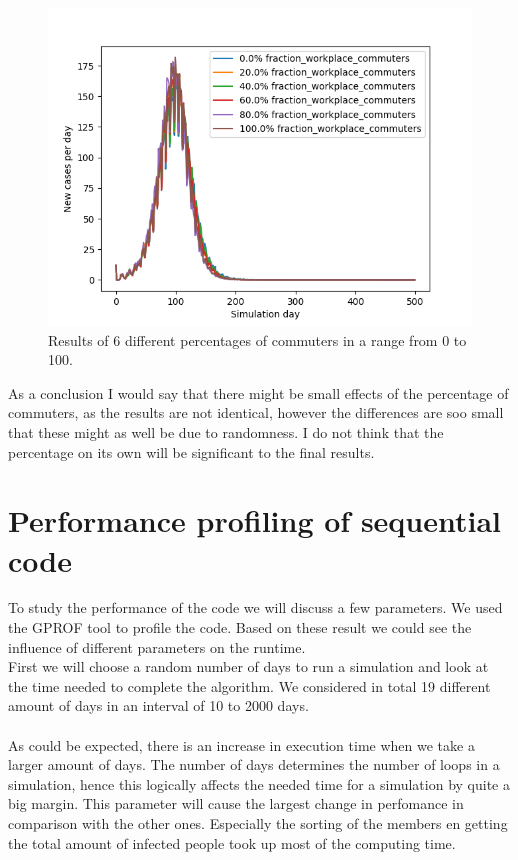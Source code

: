 \documentclass[runningheads]{llncs}
\begin{document}
	\begin{figure}
		\includegraphics[width=\textwidth]{commuting_new.png}
		\caption{Results of 6 different percentages of commuters in a range from 0 to 100.}
	\end{figure}

	\noindent
	As a conclusion I would say that there might be small effects of the percentage of commuters, as the results are not identical, however the differences are soo small that these might as well be due to randomness. I do not think that the percentage on its own will be significant to the final results.
	
	
	\section{Performance profiling of sequential code}
	To study the performance of the code we will discuss a few parameters. We used the GPROF tool to profile the code. Based on these result we could see the influence of different parameters on the runtime.
	\\
	First we will choose a random number of days to run a simulation and look at the time needed to complete the algorithm. We considered in total 19 different amount of days in an interval of 10 to 2000 days. \\ 
	\\
	As could be expected, there is an increase in execution time when we take a larger amount of days. The number of days determines the number of loops in a simulation, hence this logically affects the needed time for a simulation by quite a big margin. This parameter will cause the largest change in perfomance in comparison with the other ones. Especially the sorting of the members en getting the total amount of infected people took up most of the computing time.
	
\end{document}
